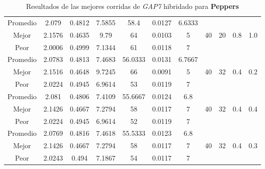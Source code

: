 \begin{table}[h!]
\begin{center}
\begin{tabular}{|c|c|c|c|c|c|c|c|c|c|c|}
        \hline
        \hline
            Promedio  & 2.079 & 0.4812 & 7.5855 & 58.4 & 0.0127 & 6.6333 &  &  &  & \\
            \cline{1-7}
            Mejor & 2.1576 & 0.4635  & 9.79 & 64 & 0.0103 & 5 & 40 & 20 & 0.8 & 1.0\\
            \cline{1-7}
            Peor & 2.0006 & 0.4999  & 7.1344 & 61 & 0.0118 & 7 &  &  &  & \\
        \hline
        \hline
            Promedio  & 2.0783 & 0.4813 & 7.4683 & 56.0333 & 0.0131 & 6.7667 &  &  &  & \\
            \cline{1-7}
            Mejor & 2.1516 & 0.4648  & 9.7245 & 66 & 0.0091 & 5 & 40 & 32 & 0.4 & 0.2\\
            \cline{1-7}
            Peor & 2.0224 & 0.4945  & 6.9614 & 53 & 0.0119 & 7 &  &  &  & \\
        \hline
        \hline
            Promedio  & 2.081 & 0.4806 & 7.4109 & 55.6667 & 0.0124 & 6.8 &  &  &  & \\
            \cline{1-7}
            Mejor & 2.1426 & 0.4667  & 7.2794 & 58 & 0.0117 & 7 & 40 & 32 & 0.4 & 0.4\\
            \cline{1-7}
            Peor & 2.0224 & 0.4945  & 6.9614 & 52 & 0.0119 & 7 &  &  &  & \\
        \hline
        \hline
            Promedio  & 2.0769 & 0.4816 & 7.4618 & 55.5333 & 0.0123 & 6.8 &  &  &  & \\
            \cline{1-7}
            Mejor & 2.1426 & 0.4667  & 7.2794 & 58 & 0.0117 & 7 & 40 & 32 & 0.4 & 0.3\\
            \cline{1-7}
            Peor & 2.0243 & 0.494  & 7.1867 & 54 & 0.0117 & 7 &  &  &  & \\
        \hline
        \end{tabular}
        \caption{Resultados de las mejores corridas de \emph{GAP7} hibridado para {\bf Peppers}}
        \label{tb:tableGAP7}
    \end{center}
\end{table}
